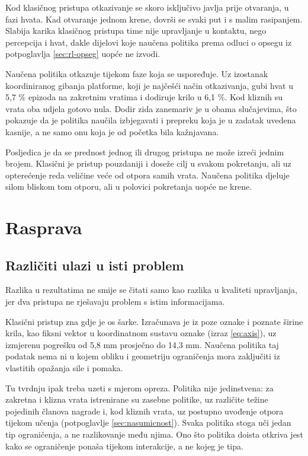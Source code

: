 Kod klasičnog pristupa otkazivanje se skoro isključivo javlja prije otvaranja, u fazi hvata.
Kad otvaranje jednom krene, dovrši se svaki put i s malim rasipanjem.
Slabija karika klasičnog pristupa time nije upravljanje u kontaktu, nego percepcija i hvat,
dakle dijelovi koje naučena politika prema odluci o opsegu iz potpoglavlja \ref{sec:rl-opseg}
uopće ne izvodi.

Naučena politika otkazuje tijekom faze koja se uspoređuje. Uz izostanak koordiniranog
gibanja platforme, koji je najčešći način otkazivanja, gubi hvat u 5,7 \% epizoda na zakretnim
vratima i dodiruje krilo u 6,1 \%. Kod kliznih su vrata oba udjela gotovo nula. Dodir zida
zanemariv je u obama slučajevima, što pokazuje da je politika naučila izbjegavati i prepreku koja
je u zadatak uvedena kasnije, a ne samo onu koja je od početka bila kažnjavana.

Posljedica je da se prednost jednog ili drugog pristupa ne može izreći jednim brojem. Klasični je
pristup pouzdaniji i doseže cilj u svakom pokretanju, ali uz opterećenje reda veličine veće od
otpora samih vrata. Naučena politika djeluje silom bliskom tom otporu, ali u polovici pokretanja
uopće ne krene.

\section{Rasprava}
\label{sec:rasprava}

\subsection{Različiti ulazi u isti problem}

Razlika u rezultatima ne smije se čitati samo kao razlika u kvaliteti upravljanja, jer dva
pristupa ne rješavaju problem s istim informacijama.

Klasični pristup zna gdje je os šarke. Izračunava je iz poze oznake i poznate širine krila,
kao fiksni vektor u koordinatnom sustavu oznake (izraz \eqref{eq:axis}), uz izmjerenu pogrešku od
5,8 mm prosječno do 14,3 mm. Naučena politika taj podatak nema ni u kojem obliku i geometriju ograničenja mora
zaključiti iz vlastitih opažanja sile i pomaka.

Tu tvrdnju ipak treba uzeti s mjerom opreza. Politika nije jedinstvena: za zakretna i klizna vrata
istrenirane su zasebne politike, uz različite težine pojedinih članova nagrade i, kod
kliznih vrata, uz postupno uvođenje otpora tijekom učenja (potpoglavlje \ref{sec:nasumicnost}).
Svaka politika stoga uči jedan tip ograničenja, a ne razlikovanje među njima. Ono što politika
doista otkriva jest kako se ograničenje ponaša tijekom interakcije, a ne kojeg je tipa.


